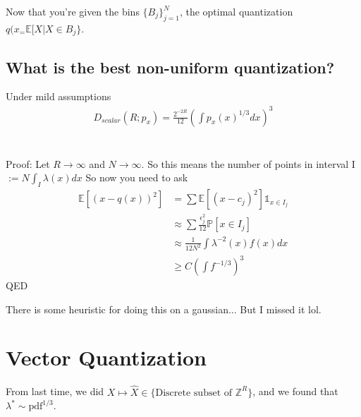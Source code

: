 Now that you're given the bins $\{B_j\}_{j=1}^N$, the optimal quantization $q(x_ = \mathbb E[X | X \in B_j\}$.


\subsection{What is the best non-uniform quantization?}
\begin{theorem}
	 Under mild assumptions
	\begin{align}
		D_{scalar}(R; p_x) = \frac{2^{-2R}}{12} \left ( \int p_x(x)^{1/3} dx\right)^3
	\end{align}
	\\
	\\
	Proof: Let $R \to \infty$ and $N \to \infty$. So this means the number of points in interval I $:= N \int_I \lambda(x) dx$ So now you need to ask
	\begin{align}
		\mathbb E[(x-q(x))^2] & = \sum \mathbb E[(x-c_j)^2] \mathds 1_{x \in I_j}\\
		&  \approx \sum \frac{\epsilon_j^2}{12} \mathbb P[x \in I_j]\\
		& \approx \frac{1}{12 N^2} \int \lambda^{-2}(x) f(x) dx \\
		& \geq C  \left(\int f^{-1/3} \right)^3 
	\end{align}
	 QED
\end{theorem}
There is some heuristic for doing this on a gaussian... But I missed it lol.




\section{Vector Quantization}

From last time, we did $X \mapsto \hat X \in \{\text{Discrete subset of } \mathbb Z^R\}$, and we found that $\lambda^* \sim \text{pdf}^{1/3}$.


